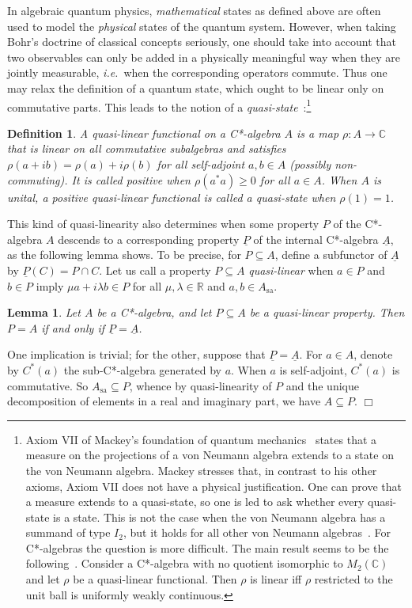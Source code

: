\documentclass[12pt]{article}
\newcommand{\alg}[1]{\ensuremath{#1}}
\newcommand{\Mtwo}{\ensuremath{M_2}(\field{C})}
\newcommand{\sa}{\ensuremath{_{\mathrm{sa}}}}
\newcommand{\field}[1]{\ensuremath{\mathbb{#1}}}
\newcommand{\uA}{\underline{A}}
\newcommand{\ie}{\textit{i.e.}}
\newtheorem{lemma}[theorem]{Lemma}
\newtheorem{definition}[theorem]{Definition}
\newenvironment{proof}[1][Proof]%
{ \begin{trivlist}%
  \item[\hskip \labelsep {\bfseries #1}]%
}%
{ \end{trivlist}%
}
\newcommand{\qed}{\nobreak\hfill$\Box$}
\begin{document}
In algebraic quantum physics, {\it mathematical} states as defined above are
often used to model
the {\it physical} states of the quantum system. However, when taking Bohr's
doctrine of classical concepts seriously, one should
take into account that two observables can only be added in a physically
meaningful way when they are
jointly measurable, \ie\ when the corresponding operators
commute. Thus one may relax the definition of a quantum state, which
 ought to be linear only on
commutative parts. This leads to the notion of a
{\it quasi-state}~\cite{Aarnes}:\footnote{Axiom VII of Mackey's foundation
  of quantum mechanics~\cite{Mackey}
states that a measure on the projections of a von
Neumann algebra extends to a state on the von Neumann algebra. Mackey stresses
that, in contrast to his other axioms, Axiom VII does not have a physical
justification. One can prove that a measure extends to a quasi-state, so one is
led to ask whether every quasi-state is a state. This is not the
case when the von Neumann algebra has a summand of type $I_2$, but it
holds for all other von Neumann algebras~\cite{BunceWright:vonNeumann}.
For C*-algebras the question is more difficult. The main result
seems to be the following~\cite{BunceWright}. Consider a C*-algebra
with no quotient isomorphic to $\Mtwo$ and let $\rho$ be a
quasi-linear functional. Then $\rho$ is linear iff $\rho$ restricted
to the unit ball is uniformly weakly continuous.}
\begin{definition}
\label{def:quasi-state}
  A \emph{quasi-linear} functional on a C*-algebra $\alg{A}$ is a map
  $\rho:\alg{A}\rightarrow \field{C}$ that is linear on all
  commutative subalgebras and satisfies $\rho(a+ib)=\rho(a)+i\rho(b)$
  for all self-adjoint  $a,b \in \alg{A}$ (possibly non-commuting). It
  is called \emph{positive} when $\rho(a^*a) \geq 0$ for all $a \in
  \alg{A}$. When $\alg{A}$ is unital, a positive quasi-linear
  functional is called a \emph{quasi-state} when $\rho(1)=1$.
\end{definition}

This kind of quasi-linearity also determines when some property $P$
of the C*-algebra $A$ descends to a corresponding property $\underline{P}$ of
the
internal C*-algebra $\uA$, as the following lemma shows. To be precise,
for $P \subseteq A$, define a subfunctor of $\uA$
by $\underline{P}(C) = P \cap C$. Let us call a property $P
\subseteq A$ \emph{quasi-linear} when $a \in P$ and $b \in P$ imply $\mu
a+i\lambda b \in P$ for all $\mu,\lambda \in \field{R}$ and
$a,b \in A\sa$.
\begin{lemma}
\label{cor:propertyonjlbextends}
  Let $A$ be a C*-algebra, and let $P \subseteq A$ be a quasi-linear
  property. Then $P=A$ if and only if $\underline{P} = \uA$.
\end{lemma}
\begin{proof}
  One implication is trivial; for the other, suppose that
  $\underline{P} = \uA$. For $a \in \alg{A}$, denote by $C^*(a)$
  the sub-C*-algebra generated by $a$. When $a$ is self-adjoint,
  $C^*(a)$ is commutative. So $\alg{A}\sa \subseteq P$, whence by
  quasi-linearity of $P$ and the unique decomposition of elements in a
  real and imaginary part, we have $\alg{A} \subseteq P$.
  \qed
\end{proof}
\end{document}
